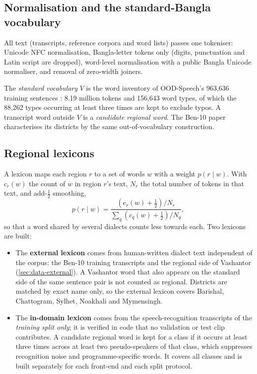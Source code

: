 \subsection{Normalisation and the standard-Bangla vocabulary}

All text (transcripts, reference corpora and word lists) passes one tokeniser:
Unicode NFC normalisation, Bangla-letter tokens only (digits, punctuation and
Latin script are dropped), word-level normalisation with a public Bangla
Unicode normaliser, and removal of zero-width joiners.

The \emph{standard vocabulary} $V$ is the word inventory of OOD-Speech's
963,636 training sentences \cite{Rakib2023OODSpeech}: 8.19 million tokens and
156,643 word types, of which the 88,262 types occurring at least three times are
kept to exclude typos. A transcript word outside $V$ is a \emph{candidate
regional word}. The Ben-10 paper characterises its districts by the same
out-of-vocabulary construction.

\subsection{Regional lexicons}

A lexicon maps each region $r$ to a set of words $w$ with a weight
$p(r \mid w)$. With $c_r(w)$ the count of $w$ in region $r$'s text, $N_r$ the
total number of tokens in that text, and add-$\tfrac12$ smoothing,
\begin{equation}
  p(r \mid w) = \frac{(c_r(w) + \tfrac12)/N_r}{\sum_{q} (c_q(w) + \tfrac12)/N_q},
  \label{eq:lexicon-weight}
\end{equation}
so that a word shared by several dialects counts less towards each. Two
lexicons are built:
\begin{itemize}
  \item The \textbf{external lexicon} comes from human-written dialect text
        independent of the corpus: the Ben-10 training transcripts and the
        regional side of Vashantor (\cref{sec:data-external}). A Vashantor word
        that also appears on the standard side of the same sentence pair is not
        counted as regional. Districts are matched by exact name only, so the
        external lexicon covers Barishal, Chattogram, Sylhet, Noakhali and
        Mymensingh.
  \item The \textbf{in-domain lexicon} comes from the speech-recognition
        transcripts of the \emph{training split only}; it is verified in code
        that no validation or test clip contributes. A candidate regional word
        is kept for a class if it occurs at least three times across at least
        two pseudo-speakers of that class, which suppresses recognition noise
        and programme-specific words. It covers all classes and is built
        separately for each front-end and each split protocol.
\end{itemize}

